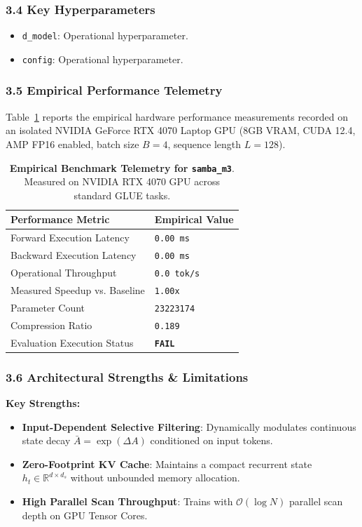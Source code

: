 \subsubsection*{3.4 Key Hyperparameters}
\begin{itemize}
    \item \texttt{d\_model}: Operational hyperparameter.
    \item \texttt{config}: Operational hyperparameter.
\end{itemize}

\subsubsection*{3.5 Empirical Performance Telemetry}
Table~\ref{tab:telemetry_samba_m3} reports the empirical hardware performance measurements recorded on an isolated NVIDIA GeForce RTX 4070 Laptop GPU (8GB VRAM, CUDA 12.4, AMP FP16 enabled, batch size $B=4$, sequence length $L=128$).

\begin{table}[h]
\centering
\small
\caption{\textbf{Empirical Benchmark Telemetry for \texttt{samba\_m3}}. Measured on NVIDIA RTX 4070 GPU across standard GLUE tasks.}
\label{tab:telemetry_samba_m3}
\begin{tabularx}{\columnwidth}{lX}
\toprule
\textbf{Performance Metric} & \textbf{Empirical Value} \\
\midrule
Forward Execution Latency & \texttt{0.00 ms} \\
Backward Execution Latency & \texttt{0.00 ms} \\
Operational Throughput & \texttt{0.0 tok/s} \\
Measured Speedup vs. Baseline & \texttt{1.00x} \\
Parameter Count & \texttt{23223174} \\
Compression Ratio & \texttt{0.189} \\
Evaluation Execution Status & \textbf{\texttt{FAIL}} \\
\bottomrule
\end{tabularx}
\end{table}

\subsubsection*{3.6 Architectural Strengths \& Limitations}
\textbf{Key Strengths:}
\begin{itemize}
    \item \textbf{Input-Dependent Selective Filtering}: Dynamically modulates continuous state decay $\bar{A} = \exp(\Delta A)$ conditioned on input tokens.
    \item \textbf{Zero-Footprint KV Cache}: Maintains a compact recurrent state $h_t \in \mathbb{R}^{d \times d_s}$ without unbounded memory allocation.
    \item \textbf{High Parallel Scan Throughput}: Trains with $\mathcal{O}(\log N)$ parallel scan depth on GPU Tensor Cores.
\end{itemize}

